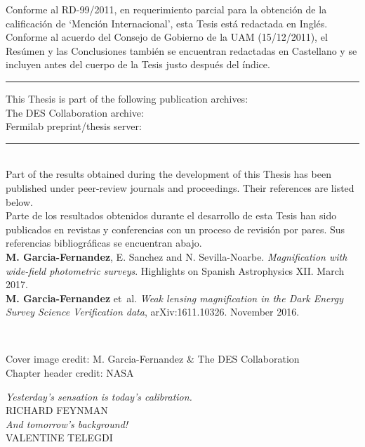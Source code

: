 \documentclass[12pt]{book} %
\begin{document}
\noindent
Conforme al RD-99/2011, en requerimiento parcial para la obtenci\'on de la calificaci\'on  de `Menci\'on Internacional', esta Tesis est\'a redactada en Ingl\'es.\\
Conforme al acuerdo del Consejo de Gobierno de la UAM (15/12/2011), el Res\'umen y las Conclusiones tambi\'en se encuentran redactadas en Castellano y se incluyen antes del cuerpo de la Tesis justo despu\'es del \'indice.
\vspace*{2cm}
\begin{flushleft}
\rule{\textwidth}{2pt}
This Thesis is part of the following publication archives:\\
The DES Collaboration archive:\\
Fermilab preprint/thesis server:\\
\rule{\textwidth}{2pt}\\
\vspace*{2cm}
\noindent
Part of the results obtained during the development of this Thesis has been published under peer-review journals and proceedings. Their references are listed below.\\

\noindent
Parte de los resultados obtenidos durante el desarrollo de esta Tesis han sido publicados en revistas y conferencias con un proceso de revisi\'on por pares. Sus referencias bibliogr\'aficas se encuentran abajo.\\
\vspace*{0.5cm}
{\bf M. Garcia-Fernandez}, E. Sanchez and N. Sevilla-Noarbe. {\it Magnification with wide-field photometric surveys}. Highlights on Spanish Astrophysics XII. March 2017.\\
\vspace*{0.5cm}
{\bf M. Garcia-Fernandez} et~al. {\it Weak lensing magnification in the Dark Energy Survey Science Verification data}, arXiv:1611.10326. November 2016.

~\vfill
\thispagestyle{empty}
\begin{footnotesize}
Cover image credit: M. Garcia-Fernandez \& The DES Collaboration\\
Chapter header credit: NASA
\end{footnotesize}
\end{flushleft}

\newpage
\thispagestyle{empty}
\begin{flushright}
\begin{large}
\vspace*{3cm}
{\it Yesterday's sensation is today's calibration.}\\
RICHARD FEYNMAN\\
\vspace{1cm}
{\it And tomorrow's background!}\\
VALENTINE TELEGDI\\
\end{large}
~\vfill
\end{flushright}
\end{document}

